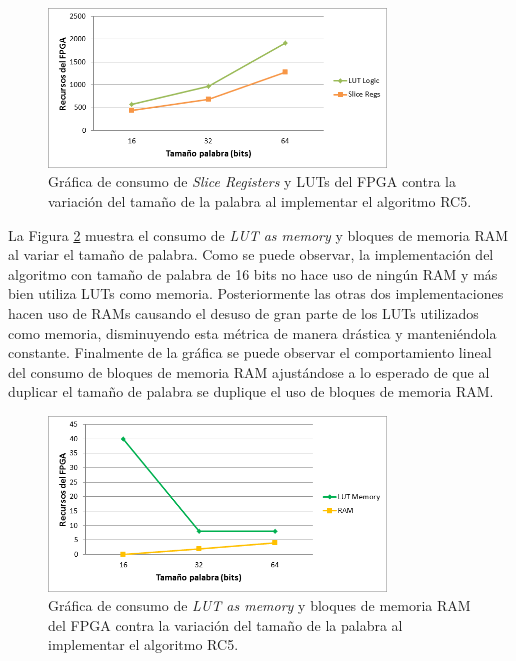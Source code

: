 \begin{figure}[H]
	\centering
	\includegraphics[width=0.8\textwidth]{./images/figSliceRegsLutsRC5}
	\caption{Gráfica de consumo de \textit{Slice Registers} y LUTs del FPGA contra la variación del tamaño de la palabra al implementar el algoritmo RC5.}
	\label{figSliceRegsLutsRC5}
\end{figure}

La Figura \ref{figRamRC5} muestra el consumo de \textit{LUT as memory} y bloques de memoria RAM al variar el tamaño de palabra. Como se puede observar, la implementación del algoritmo con tamaño de palabra de 16 bits no hace uso de ningún RAM y más bien utiliza LUTs como memoria. Posteriormente las otras dos implementaciones hacen uso de RAMs causando el desuso de gran parte de los LUTs utilizados como memoria, disminuyendo esta métrica de manera drástica y manteniéndola constante. Finalmente de la gráfica se puede observar el comportamiento lineal del consumo de bloques de memoria RAM ajustándose a lo esperado de que al duplicar el tamaño de palabra se duplique el uso de bloques de memoria RAM.
\begin{figure}[H]
	\centering
	\includegraphics[width=0.8\textwidth]{./images/figRamRC5}
	\caption{Gráfica de consumo de \textit{LUT as memory} y bloques de memoria RAM del FPGA contra la variación del tamaño de la palabra al implementar el algoritmo RC5.}
	\label{figRamRC5}
\end{figure}

